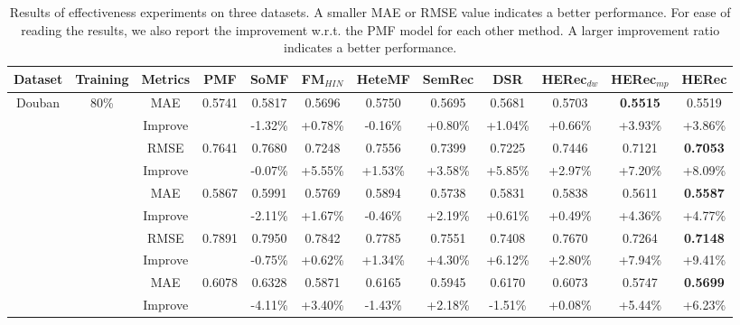 \begin{table}[t]
\centering
\caption{\label{tab_Effectiveness} Results of effectiveness experiments on three datasets. A smaller MAE or RMSE value indicates a better performance. For ease of reading the results, we also report the improvement w.r.t. the PMF model for each other method. A larger improvement ratio indicates a better performance. }
{
\begin{tabular}{|c|c|c||c|c|c|c|c|c||c|c||c|}
\hline
{Dataset} & {Training} & {Metrics}  & {PMF} &{SoMF} & {FM$_{HIN}$} & {HeteMF}& {SemRec}  & {DSR} & {HERec$_{dw}$} & {HERec$_{mp}$}&{HERec}\\
\hline
\hline
\multirow{16}{*}{Douban}& \multirow{4}{*}{80\%} & {MAE} & {0.5741} & {0.5817} & {0.5696} & {0.5750} & {0.5695} &  {0.5681}  & {0.5703} & {\textbf{0.5515}} &{0.5519} \\
\multirow{16}{*}{} &\multirow{4}{*}{}& {Improve} & {} & {-1.32\%} & {+0.78\%} & {-0.16\%} & {+0.80\%}  & {+1.04\%} & {+0.66\%} &{+3.93\%} & {+3.86\%} \\
\cline{3-12}
\multirow{16}{*}{Movie} &\multirow{4}{*}{}& {RMSE} & {0.7641} & {0.7680} &   {0.7248} & {0.7556}& {0.7399} & {0.7225} & {0.7446} & {0.7121} & {\textbf{0.7053}} \\
\multirow{16}{*}{} &\multirow{4}{*}{}& {Improve} & {} & {-0.07\%} & {+5.55\%} & {+1.53\%} & {+3.58\%}  & {+5.85\%} & {+2.97\%} &{+7.20\%} & {+8.09\%} \\
\cline{2-12}
\multirow{16}{*}{} &\multirow{4}{*}{}\multirow{4}{*}{60\%} & {MAE} & {0.5867} & {0.5991} & {0.5769} & {0.5894} & {0.5738} &  {0.5831} & {0.5838} & {0.5611} &{\textbf{0.5587}} \\
\multirow{16}{*}{} &\multirow{4}{*}{}& {Improve} & {} & {-2.11\%} & {+1.67\%} & {-0.46\%} & {+2.19\%}  & {+0.61\%} & {+0.49\%} &{+4.36\%} & {+4.77\%} \\
\cline{3-12}
\multirow{16}{*}{} &\multirow{4}{*}{}& {RMSE} & {0.7891} & {0.7950} & {0.7842} & {0.7785} & {0.7551} &  {0.7408} & {0.7670} & {0.7264} &{\textbf{0.7148}} \\
\multirow{16}{*}{} &\multirow{4}{*}{}& {Improve} & {} & {-0.75\%} & {+0.62\%} & {+1.34\%} & {+4.30\%}  & {+6.12\%} & {+2.80\%} &{+7.94\%} & {+9.41\%} \\
\cline{2-12}
\multirow{16}{*}{} &\multirow{4}{*}{}\multirow{4}{*}{40\%} & {MAE} & {0.6078} & {0.6328} &  {0.5871} & {0.6165} & {0.5945} &  {0.6170} & {0.6073} & {0.5747} &{\textbf{0.5699}}\\
\multirow{16}{*}{} &\multirow{4}{*}{}& {Improve} & {} & {-4.11\%} & {+3.40\%} & {-1.43\%} & {+2.18\%}  & {-1.51\%} & {+0.08\%} &{+5.44\%} & {+6.23\%} \\

\end{tabular}}
\end{table}
